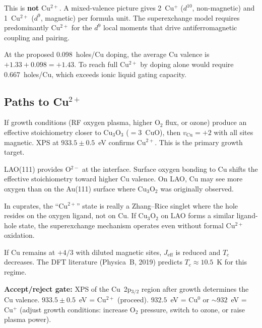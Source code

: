 \documentclass[11pt, a4paper]{article}
\begin{document}
This is \textbf{not} Cu$^{2+}$. A mixed-valence picture gives
2~Cu$^+$ ($d^{10}$, non-magnetic) and 1~Cu$^{2+}$ ($d^9$,
magnetic) per formula unit. The superexchange model requires
predominantly Cu$^{2+}$ for the $d^9$ local moments that drive
antiferromagnetic coupling and pairing.

At the proposed 0.098~holes/Cu doping, the average Cu valence
is $+1.33 + 0.098 = +1.43$. To reach full Cu$^{2+}$ by doping
alone would require 0.667~holes/Cu, which exceeds ionic liquid
gating capacity.

\subsection{Paths to Cu$^{2+}$}

\begin{description}[nosep]
  \item[Path~A: Oxygen-rich stoichiometry.] If growth conditions
    (RF oxygen plasma, higher O$_2$ flux, or ozone) produce an
    effective stoichiometry closer to Cu$_3$O$_3$ ($= 3$~CuO),
    then $v_{\text{Cu}} = +2$ with all sites magnetic. XPS
    at $933.5 \pm 0.5$~eV confirms Cu$^{2+}$. This is the
    primary growth target.
  \item[Path~B: Substrate oxygen.] LAO(111) provides O$^{2-}$
    at the interface. Surface oxygen bonding to Cu shifts the
    effective stoichiometry toward higher Cu valence. On LAO,
    Cu may see more oxygen than on the Au(111) surface where
    Cu$_3$O$_2$ was originally observed.
  \item[Path~C: Ligand-hole state.] In cuprates, the ``Cu$^{2+}$''
    state is really a Zhang--Rice singlet where the hole resides
    on the oxygen ligand, not on Cu. If Cu$_3$O$_2$ on LAO forms
    a similar ligand-hole state, the superexchange mechanism
    operates even without formal Cu$^{2+}$ oxidation.
  \item[Path~D: Mixed valence (fallback).] If Cu remains at
    $+4/3$ with diluted magnetic sites, $J_{\text{eff}}$ is
    reduced and $T_c$ decreases. The DFT literature
    (Physica~B, 2019) predicts $T_c \approx 10.5$~K for
    this regime.
\end{description}

\textbf{Accept/reject gate:} XPS of the Cu~2p$_{3/2}$ region
after growth determines the Cu valence. $933.5 \pm 0.5$~eV
= Cu$^{2+}$ (proceed). $932.5$~eV = Cu$^0$ or $\sim 932$~eV
= Cu$^+$ (adjust growth conditions: increase O$_2$ pressure,
switch to ozone, or raise plasma power).
\end{document}
